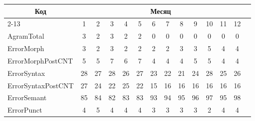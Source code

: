 \begin{table}\small %


\begin{center}




\label{t2-z}


\vspace*{2ex}





\tabcolsep=3.5pt 


\begin{tabular}{|l|c|c|c|c|c|c|c|c|c|c|c|c|c|}


\hline


\multicolumn{1}{|c|}{Код}&\multicolumn{12}{c|}{ Месяц}\\ 


\cline{2-13}


\multicolumn{1}{|c|}{ошибки}&1&2&3&4&5&6&7&8&9&10&11&12\\


\hline


AgramTotal&3&2&3&2&2&0&0&0&0&0&0&0\\


ErrorMorph&3&2&3&2&2&2&2&3&3&5&4&4\\


ErrorMorphPostCNT&5&5&7&6&7&4&4&4&5&5&4&4\\


ErrorSyntax&28\hphantom{9}&27\hphantom{9}&28\hphantom{9}&26\hphantom{9}


&27\hphantom{9}&23\hphantom{9}&22\hphantom{9}&21\hphantom{9}&


24\hphantom{9}&28\hphantom{9}&25\hphantom{9}&26\hphantom{9}\\


ErrorSyntaxPostCNT&27\hphantom{9}&24\hphantom{9}&22\hphantom{9}&


25\hphantom{9}&22\hphantom{9}&15\hphantom{9}&16\hphantom{9}&16\hphantom{9}


&16\hphantom{9}&16\hphantom{9}&16\hphantom{9}&16\hphantom{9}\\


ErrorSemant&85\hphantom{9}&84\hphantom{9}&82\hphantom{9}&83\hphantom{9}


&83\hphantom{9}&93\hphantom{9}&94\hphantom{9}&95\hphantom{9}&96\hphantom{9}


&97\hphantom{9}&95\hphantom{9}&98\hphantom{9}\\


ErrorPunct&4&5&4&4&4&3&3&3&3&2&4&4\\



\end{tabular}
\end{center}
\end{table}
